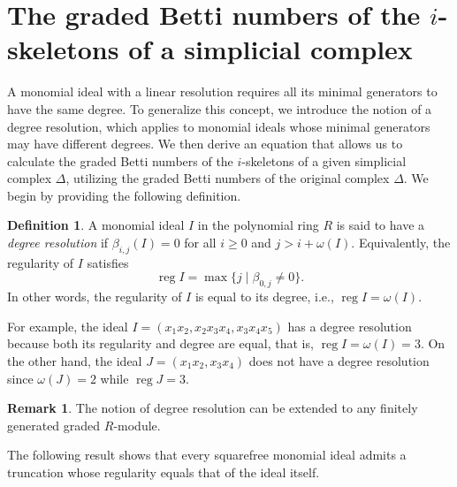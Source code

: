 \documentclass[a4paper,12pt]{amsart}
\numberwithin{equation}{section}
\theoremstyle{definition}
\newtheorem{definition}[theorem]{Definition}
\newtheorem{remark}[theorem]{Remark}
\DeclareMathOperator{\reg}{reg}
\begin{document}
\section{The graded Betti numbers of the $i$-skeletons of a simplicial complex}

A monomial ideal with a linear resolution requires all its minimal generators to have the same degree. To generalize this concept, we introduce the notion of a degree resolution, which applies to monomial ideals whose minimal generators may have different degrees. We then derive an equation that allows us to calculate the graded Betti numbers of the $i$-skeletons of a given simplicial complex $\Delta$, utilizing the graded Betti numbers of the original complex $\Delta$. We begin by providing the following definition.

\begin{definition}\label{degree resolution}
	A monomial ideal $I$ in the polynomial ring $R$ is said to have a \emph{degree resolution} if $\beta_{i,j}(I)=0$ for all $i\ge0$ and $j>i+\omega(I)$. Equivalently, the regularity of $I$ satisfies  
	$$\reg I=\max\{j\mid \beta_{0,j}\ne0\}.$$
	In other words, the regularity of $I$ is equal to its degree, i.e., $\reg I = \omega(I)$.
\end{definition}

For example, the ideal $I=(x_1x_2,x_2x_3x_4,x_3x_4x_5)$ has a degree resolution because both its regularity and degree are equal, that is, $\reg I=\omega(I)=3$. On the other hand, the ideal $J=(x_1x_2,x_3x_4)$ does not have a degree resolution since $\omega(J)=2$ while $\reg J=3$.

\begin{remark}
	The notion of degree resolution can be extended to any finitely generated graded $R$-module.
\end{remark}

The following result shows that every squarefree monomial ideal admits a truncation whose regularity equals that of the ideal itself.

\end{document}

